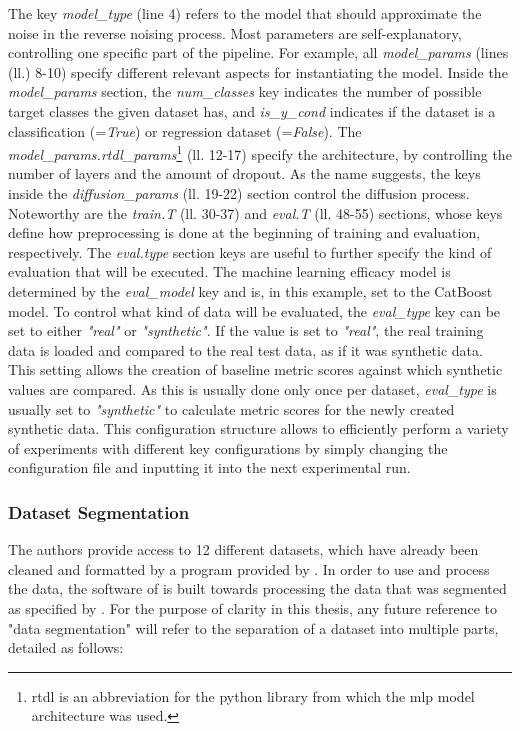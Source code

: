 The key \textit{model\_type} (line 4) refers to the \gls{model} that should approximate the noise in the reverse noising process.
Most parameters are self-explanatory, controlling one specific part of the pipeline.
For example, all \textit{model\_params} (lines (ll.) 8-10) specify different relevant aspects for instantiating the \gls{model}.
Inside the \textit{model\_params} section, the \textit{num\_classes} key indicates the number of possible target classes the given dataset has, and \textit{is\_y\_cond} indicates if the dataset is a classification (=\textit{True}) or regression dataset (=\textit{False}).
The \textit{model\_params.rtdl\_params}\footnote{rtdl is an abbreviation for the python library \cite{gorishniy2021RevisitingDeepLearning} from which the \gls{mlp} \gls{model} architecture was used.} (ll. 12-17) specify the  architecture, by controlling the number of layers and the amount of dropout.
As the name suggests, the keys inside the \textit{diffusion\_params} (ll. 19-22) section control the diffusion process.
Noteworthy are the \textit{train.T} (ll. 30-37) and \textit{eval.T} (ll. 48-55) sections, whose keys define how preprocessing is done at the beginning of training and evaluation, respectively.
The \textit{eval.type} section keys are useful to further specify the kind of evaluation that will be executed.
The machine learning efficacy \gls{model} is determined by the \textit{eval\_model} key and is, in this example, set to the CatBoost \gls{model}.
To control what kind of data will be evaluated, the \textit{eval\_type} key can be set to either \textit{"real"} or \textit{"synthetic"}.
If the value is set to \textit{"real"}, the real training data is loaded and compared to the real test data, as if it was synthetic data.
This setting allows the creation of baseline metric scores against which synthetic values are compared.
As this is usually done only once per dataset, \textit{eval\_type} is usually set to \textit{"synthetic"} to calculate metric scores for the newly created synthetic data.
This configuration structure allows to efficiently perform a variety of experiments with different key configurations by simply changing the configuration file and inputting it into the next experimental run.

\subsubsection[]{Dataset Segmentation}
\label{sec:data_format}
The authors provide access to 12 different datasets, which have already been cleaned and formatted by a program provided by \textcite{gorishniy2023EmbeddingsNumericalFeatures}.
In order to use and process the data, the software of \cite{kotelnikov2022TabDDPMModellingTabular} is built towards processing the data that was segmented as specified by \textcite{gorishniy2023EmbeddingsNumericalFeatures}.
For the purpose of clarity in this thesis, any future reference to "data segmentation" will refer to the separation of a dataset into multiple parts, detailed as follows:

